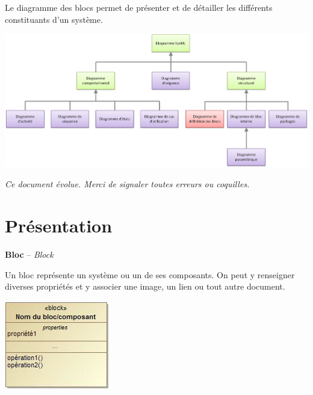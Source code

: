 \documentclass[11pt,oneside]{article}
\begin{document}
Le diagramme des blocs permet de présenter et de détailler les différents constituants d'un système.
\begin{center}
\includegraphics[width=\textwidth]{png/def_blocs}
\end{center}
 
\setlength{\parskip}{0ex plus 0.2ex minus 0ex}
 \renewcommand{\contentsname}{}
 \renewcommand{\baselinestretch}{1}

\tableofcontents

 \renewcommand{\baselinestretch}{1.2}
\setlength{\parskip}{2ex plus 0.5ex minus 0.2ex}

\textit{Ce document évolue. Merci de signaler toutes erreurs ou coquilles.}

\section{Présentation}

\begin{defi}
\begin{minipage}[c]{.7\linewidth}
\textbf{Bloc} --  \textit{Block}

Un bloc représente un système ou un de ses composants. On peut y renseigner diverses propriétés et y associer une image, un lien ou tout autre document. 
\end{minipage}\hfill
\begin{minipage}[c]{.25\linewidth}
\begin{center}
\includegraphics[width=.9\textwidth]{png/block}
\end{center}
\end{minipage}
\end{defi}
\end{document}
